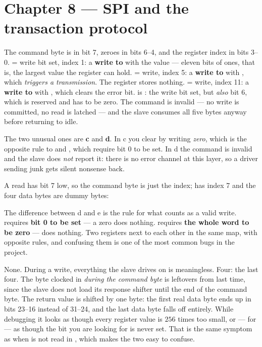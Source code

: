 \section*{Chapter 8 --- SPI and the transaction protocol}

The command byte is  in bit 7, zeroes in bits 6--4, and the register index in bits 3--0.
  = write bit set, index 1: a \textbf{write to } with the value
 --- eleven bits of ones, that is, the largest value the register can hold.
  = write, index 5: a \textbf{write to } with , which
\emph{triggers a transmission}. The register stores nothing.
  = write, index 11: a \textbf{write to } with ,
which clears the error bit.
  is : the write bit set, but \emph{also} bit 6, which is
reserved and has to be zero. The command is invalid --- no write is committed, no read is latched
--- and the slave consumes all five bytes anyway before returning to idle.

The two unusual ones are \textbf{c} and \textbf{d}. In c you clear by writing \emph{zero}, which
is the opposite rule to  and , which require bit 0 to be set. In d the
command is invalid and the slave does \emph{not} report it: there is no error channel at this
layer, so a driver sending junk gets silent nonsense back.

 A read has bit 7 low, so the command byte is just the index;  has index 7 and
the four data bytes are dummy bytes: 
 
 
 
 

The difference between d and e is the rule for what counts as a valid write. 
requires \textbf{bit 0 to be set} --- a zero does nothing.  requires \textbf{the
whole word to be zero} ---  does nothing. Two registers next to each other in the same
map, with opposite rules, and confusing them is one of the most common bugs in the project.

 None. During a write, everything the slave drives on  is meaningless.
 Four: the last four. The byte clocked in \emph{during the command byte} is leftovers from
last time, since the slave does not load its response shifter until the end of the command byte.
 The return value is shifted by one byte: the first real data byte ends up in bits 23--16
instead of 31--24, and the last data byte falls off entirely. While debugging it looks as though
every register value is $256$ times too small, or --- for  --- as though the bit you
are looking for is never set. That is the same symptom as when  is not read in
, which makes the two easy to confuse.

